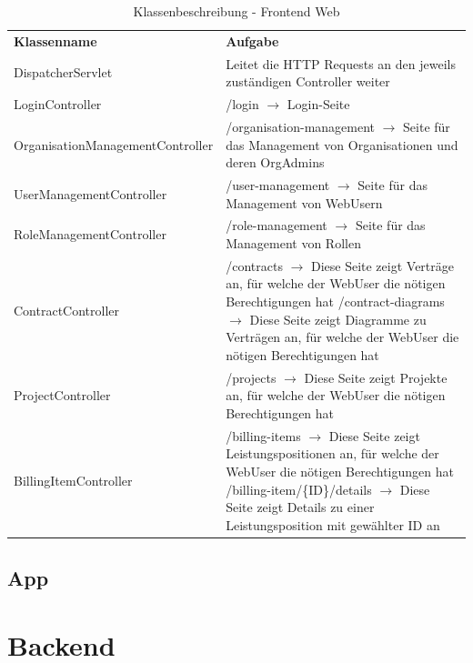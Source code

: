 \begin{table}[h]
	\centering
	\begin{tabularx}{\textwidth}{X X}
		\rowcolor[HTML]{C0C0C0} 
		\textbf{Klassenname} & \textbf{Aufgabe} \\
		DispatcherServlet & Leitet die HTTP Requests an den jeweils zuständigen Controller weiter \\
		\rowcolor[HTML]{E7E7E7} 
		LoginController & /login $\rightarrow$ Login-Seite \\
		OrganisationManagementController & /organisation-management $\rightarrow$ Seite für das Management von Organisationen und deren OrgAdmins \\
		\rowcolor[HTML]{E7E7E7} 
		UserManagementController & /user-management $\rightarrow$ Seite für das Management von WebUsern \\
		RoleManagementController & /role-management $\rightarrow$ Seite für das Management von Rollen \\
		\rowcolor[HTML]{E7E7E7} 
		ContractController & /contracts $\rightarrow$ Diese Seite zeigt Verträge an, für welche der WebUser die nötigen Berechtigungen hat \newline
		/contract-diagrams $\rightarrow$ Diese Seite zeigt Diagramme zu Verträgen an, für welche der WebUser die nötigen Berechtigungen hat \\
		ProjectController & /projects $\rightarrow$ Diese Seite zeigt Projekte an, für welche der WebUser die nötigen Berechtigungen hat \\
		\rowcolor[HTML]{E7E7E7} 
		BillingItemController & /billing-items $\rightarrow$ Diese Seite zeigt Leistungspositionen an, für welche der WebUser die nötigen Berechtigungen hat \newline
		/billing-item/\{ID\}/details $\rightarrow$ Diese Seite zeigt Details zu einer Leistungsposition mit gewählter ID an
	\end{tabularx}
	\caption{Klassenbeschreibung - Frontend Web}
	\label{table:klassenbeschreibung-web}
\end{table}

\clearpage

\subsection{App}

\section{Backend}
